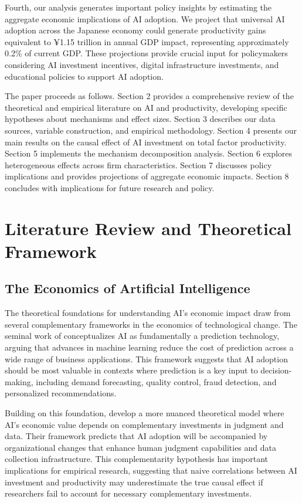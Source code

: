 \documentclass[12pt]{article}
\begin{document}
Fourth, our analysis generates important policy insights by estimating the aggregate economic implications of AI adoption. We project that universal AI adoption across the Japanese economy could generate productivity gains equivalent to ¥1.15 trillion in annual GDP impact, representing approximately 0.2\% of current GDP. These projections provide crucial input for policymakers considering AI investment incentives, digital infrastructure investments, and educational policies to support AI adoption.

The paper proceeds as follows. Section 2 provides a comprehensive review of the theoretical and empirical literature on AI and productivity, developing specific hypotheses about mechanisms and effect sizes. Section 3 describes our data sources, variable construction, and empirical methodology. Section 4 presents our main results on the causal effect of AI investment on total factor productivity. Section 5 implements the mechanism decomposition analysis. Section 6 explores heterogeneous effects across firm characteristics. Section 7 discusses policy implications and provides projections of aggregate economic impacts. Section 8 concludes with implications for future research and policy.

\section{Literature Review and Theoretical Framework}

\subsection{The Economics of Artificial Intelligence}

The theoretical foundations for understanding AI's economic impact draw from several complementary frameworks in the economics of technological change. The seminal work of \citet{brynjolfsson2019artificial} conceptualizes AI as fundamentally a prediction technology, arguing that advances in machine learning reduce the cost of prediction across a wide range of business applications. This framework suggests that AI adoption should be most valuable in contexts where prediction is a key input to decision-making, including demand forecasting, quality control, fraud detection, and personalized recommendations.

Building on this foundation, \citet{agrawal2018prediction} develop a more nuanced theoretical model where AI's economic value depends on complementary investments in judgment and data. Their framework predicts that AI adoption will be accompanied by organizational changes that enhance human judgment capabilities and data collection infrastructure. This complementarity hypothesis has important implications for empirical research, suggesting that naive correlations between AI investment and productivity may underestimate the true causal effect if researchers fail to account for necessary complementary investments.
\end{document}
